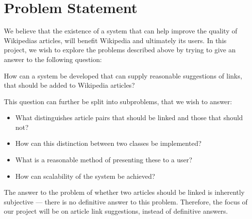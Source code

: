 \section{Problem Statement}\label{sec:problem_statement}
We believe that the existence of a system that can help improve the quality of Wikipedias articles, will benefit Wikipedia and ultimately its users. In this project, we wish to explore the problems described above by trying to give an answer to the following question:

\begin{formal}
How can a system be developed that can supply reasonable suggestions of links, that should be added to Wikipedia articles?
\end{formal}

This question can further be split into subproblems, that we wish to answer:
\begin{itemize}
  \item What distinguishes article pairs that should be linked and those that should not?
  \item How can this distinction between two classes be implemented?
  \item What is a reasonable method of presenting these to a user?
  \item How can scalability of the system be achieved?
\end{itemize}

The answer to the problem of whether two articles should be linked is inherently subjective --- there is no definitive answer to this problem. Therefore, the focus of our project will be on article link suggestions, instead of definitive answers.







